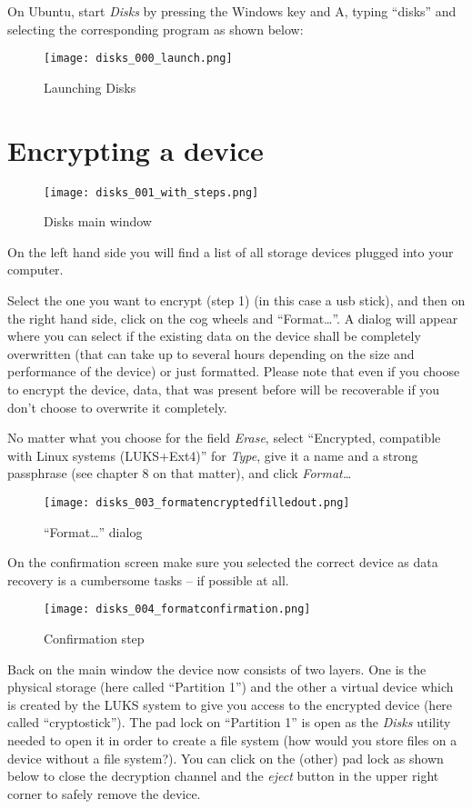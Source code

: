 \documentclass[10pt,a5paper,twoside,,]{book}
\begin{document}
On Ubuntu, start \emph{Disks} by pressing the Windows key and A, typing
``disks'' and selecting the corresponding program as shown below:

\begin{figure}[htbp]
\centering
\texttt{[image: disks\_000\_launch.png]}
\caption{Launching Disks}
\end{figure}

\section{Encrypting a device}\label{encrypting-a-device}

\begin{figure}[htbp]
\centering
\texttt{[image: disks\_001\_with\_steps.png]}
\caption{Disks main window}
\end{figure}

On the left hand side you will find a list of all storage devices
plugged into your computer.

Select the one you want to encrypt (step 1) (in this case a usb stick),
and then on the right hand side, click on the cog wheels and
``Format\ldots{}''. A dialog will appear where you can select if the
existing data on the device shall be completely overwritten (that can
take up to several hours depending on the size and performance of the
device) or just formatted. Please note that even if you choose to
encrypt the device, data, that was present before will be recoverable if
you don't choose to overwrite it completely.

No matter what you choose for the field \emph{Erase}, select
``Encrypted, compatible with Linux systems (LUKS+Ext4)'' for
\emph{Type}, give it a name and a strong passphrase (see chapter 8 on
that matter), and click \emph{Format\ldots{}}

\begin{figure}[htbp]
\centering
\texttt{[image: disks\_003\_formatencryptedfilledout.png]}
\caption{``Format\ldots{}'' dialog}
\end{figure}

On the confirmation screen make sure you selected the correct device as
data recovery is a cumbersome tasks -- if possible at all.

\begin{figure}[htbp]
\centering
\texttt{[image: disks\_004\_formatconfirmation.png]}
\caption{Confirmation step}
\end{figure}

Back on the main window the device now consists of two layers. One is
the physical storage (here called ``Partition 1'') and the other a
virtual device which is created by the LUKS system to give you access to
the encrypted device (here called ``cryptostick''). The pad lock on
``Partition 1'' is open as the \emph{Disks} utility needed to open it in
order to create a file system (how would you store files on a device
without a file system?). You can click on the (other) pad lock as shown
below to close the decryption channel and the \emph{eject} button in the
upper right corner to safely remove the device.
\end{document}
